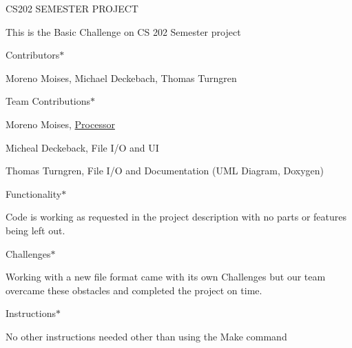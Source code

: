 CS202 SEMESTER PROJECT

This is the Basic Challenge on CS 202 Semester project

Contributors$\ast$

Moreno Moises, Michael Deckebach, Thomas Turngren

Team Contributions$\ast$

Moreno Moises, \mbox{\hyperlink{classProcessor}{Processor}}

Micheal Deckeback, File I/O and UI

Thomas Turngren, File I/O and Documentation (UML Diagram, Doxygen)



Functionality$\ast$

Code is working as requested in the project description with no parts or features being left out.

Challenges$\ast$

Working with a new file format came with its own Challenges but our team overcame these obstacles and completed the project on time.

Instructions$\ast$

No other instructions needed other than using the Make command 